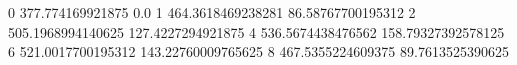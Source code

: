 0 377.774169921875 0.0
1 464.3618469238281 86.58767700195312
2 505.1968994140625 127.4227294921875
4 536.5674438476562 158.79327392578125
6 521.0017700195312 143.22760009765625
8 467.5355224609375 89.7613525390625
